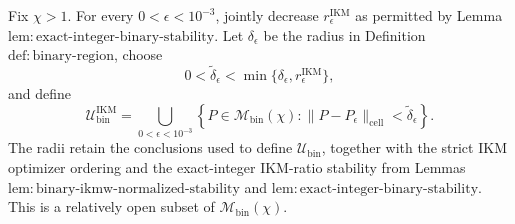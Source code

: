 Fix \(\chi>1\).  For every \(0<\epsilon<10^{-3}\), jointly decrease \(r_\epsilon^{\mathrm{IKM}}\) as permitted by Lemma~\(\mathrm{lem{:}exact\text{-}integer\text{-}binary\text{-}stability}\).  Let \(\delta_\epsilon\) be the radius in Definition~\(\mathrm{def{:}binary\text{-}region}\), choose
\[
 0<\widetilde\delta_\epsilon
 <\min\{\delta_\epsilon,r_\epsilon^{\mathrm{IKM}}\},
\]
and define
\[
 \mathcal U_{\mathrm{bin}}^{\mathrm{IKM}}
 =\bigcup_{0<\epsilon<10^{-3}}
 \left\{P\in\mathcal M_{\mathrm{bin}}(\chi):
 \|P-P_\epsilon\|_{\mathrm{cell}}<\widetilde\delta_\epsilon\right\}. \tag{1}
\]
The radii retain the conclusions used to define \(\mathcal U_{\mathrm{bin}}\), together with the strict IKM optimizer ordering and the exact-integer IKM-ratio stability from Lemmas~\(\mathrm{lem{:}binary\text{-}ikmw\text{-}normalized\text{-}stability}\) and \(\mathrm{lem{:}exact\text{-}integer\text{-}binary\text{-}stability}\).  This is a relatively open subset of \(\mathcal M_{\mathrm{bin}}(\chi)\).